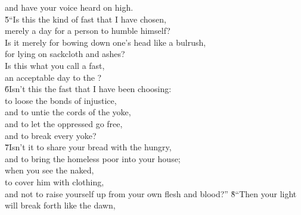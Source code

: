 \begin{poetry}
\poemll    and have your voice heard on high. \\
\poeml \v{5}``Is this the kind of fast that I have chosen, \\
\poemll    merely a day for a person to humble himself? \\
\poeml Is it merely for bowing down one's head like a bulrush, \\
\poemll    for lying on sackcloth and ashes? \\
\poeml Is this what you call a fast, \\
\poemll    an acceptable day to the ? \\
\poeml \v{6}Isn't this the fast that I have been choosing: \\
\poemll    to loose the bonds of injustice, \\
\poeml and to untie the cords of the yoke, \\
\poemll    and to let the oppressed go free, \\
\poemlll       and to break every yoke? \\
\poeml \v{7}Isn't it to share your bread with the hungry, \\
\poemll    and to bring the homeless poor into your house; \\
\poeml when you see the naked, \\
\poemll    to cover him with clothing, \\
\poemlll       and not to raise yourself up from your own flesh and blood?''
\poeml \v{8}``Then your light will break forth like the dawn, \\

\end{poetry}
